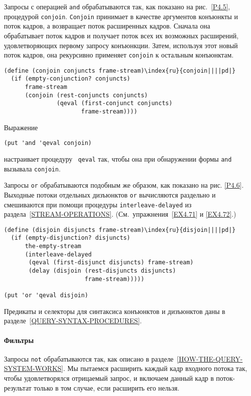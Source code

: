 Запросы с операцией {\tt and} 
обрабатываются так, как показано на рис.~\ref{P4.5}, процедурой
{\tt conjoin}. {\tt Conjoin} принимает в качестве
аргументов конъюнкты и поток кадров, а возвращает поток расширенных
кадров.  Сначала она обрабатывает поток кадров и получает поток всех
их возможных расширений, удовлетворяющих первому запросу
конъюнкции. Затем, используя этот новый поток кадров, она рекурсивно
применяет {\tt conjoin} к остальным конъюнктам.

\begin{Verbatim}[fontsize=\small]
(define (conjoin conjuncts frame-stream)\index{ru}{conjoin||||pd|}
  (if (empty-conjunction? conjuncts)
      frame-stream
      (conjoin (rest-conjuncts conjuncts)
               (qeval (first-conjunct conjuncts)
                      frame-stream))))
\end{Verbatim}
Выражение

\begin{Verbatim}[fontsize=\small]
(put 'and 'qeval conjoin)
\end{Verbatim}
настраивает процедуру {\tt 
qeval} так, чтобы она при обнаружении формы 
{\tt and} вызывала {\tt conjoin}.

Запросы {\tt or} обрабатываются подобным же
образом, как показано на рис. \ref{P4.6}.  Выходные потоки
отдельных дизъюнктов {\tt or} вычисляются раздельно и
смешиваются при помощи процедуры {\tt interleave-delayed} из
раздела~\ref{STREAM-OPERATIONS}. 
(См.~упражнения~\ref{EX4.71} и \ref{EX4.72}.)

\begin{Verbatim}[fontsize=\small]
(define (disjoin disjuncts frame-stream)\index{ru}{disjoin||||pd|}
  (if (empty-disjunction? disjuncts)
      the-empty-stream
      (interleave-delayed
       (qeval (first-disjunct disjuncts) frame-stream)
       (delay (disjoin (rest-disjuncts disjuncts)
                       frame-stream)))))

(put 'or 'qeval disjoin)
\end{Verbatim}
Предикаты и селекторы для 
синтаксиса конъюнктов и дизъюнктов даны в 
разделе~\ref{QUERY-SYNTAX-PROCEDURES}.

\paragraph{Фильтры}


Запросы {\tt not} обрабатываются так, как
описано в разделе~\ref{HOW-THE-QUERY-SYSTEM-WORKS}. Мы
пытаемся расширить каждый кадр входного потока так, чтобы
удовлетворялся отрицаемый запрос, и включаем данный кадр в
поток-результат только в том случае, если расширить его 
нельзя.


